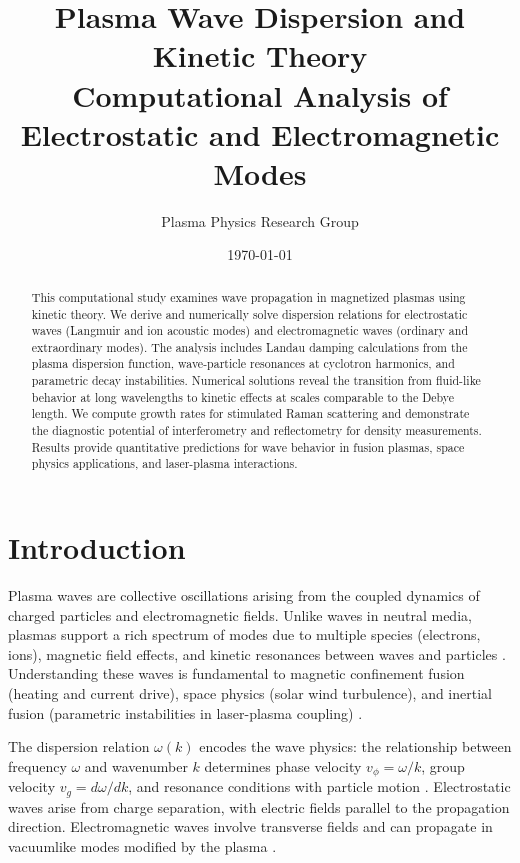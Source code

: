 \documentclass[11pt,a4paper]{article}
\title{Plasma Wave Dispersion and Kinetic Theory\\Computational Analysis of Electrostatic and Electromagnetic Modes}
\author{Plasma Physics Research Group}
\date{\today}
\begin{document}
\maketitle

\begin{abstract}
This computational study examines wave propagation in magnetized plasmas using kinetic theory. We derive and numerically solve dispersion relations for electrostatic waves (Langmuir and ion acoustic modes) and electromagnetic waves (ordinary and extraordinary modes). The analysis includes Landau damping calculations from the plasma dispersion function, wave-particle resonances at cyclotron harmonics, and parametric decay instabilities. Numerical solutions reveal the transition from fluid-like behavior at long wavelengths to kinetic effects at scales comparable to the Debye length. We compute growth rates for stimulated Raman scattering and demonstrate the diagnostic potential of interferometry and reflectometry for density measurements. Results provide quantitative predictions for wave behavior in fusion plasmas, space physics applications, and laser-plasma interactions.
\end{abstract}

\section{Introduction}

Plasma waves are collective oscillations arising from the coupled dynamics of charged particles and electromagnetic fields. Unlike waves in neutral media, plasmas support a rich spectrum of modes due to multiple species (electrons, ions), magnetic field effects, and kinetic resonances between waves and particles \cite{Stix1992,Swanson2003}. Understanding these waves is fundamental to magnetic confinement fusion (heating and current drive), space physics (solar wind turbulence), and inertial fusion (parametric instabilities in laser-plasma coupling) \cite{Chen2016,Gurnett2017}.

The dispersion relation $\omega(k)$ encodes the wave physics: the relationship between frequency $\omega$ and wavenumber $k$ determines phase velocity $v_{\phi} = \omega/k$, group velocity $v_g = d\omega/dk$, and resonance conditions with particle motion \cite{Swanson2003}. Electrostatic waves arise from charge separation, with electric fields parallel to the propagation direction. Electromagnetic waves involve transverse fields and can propagate in vacuumlike modes modified by the plasma \cite{Stix1992}.
\end{document}
